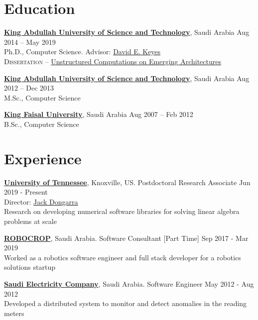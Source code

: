 \documentclass[margin]{resume2}
\begin{document}
  \begin{resume}


    \section{Education} {\bf \href{https://www.kaust.edu.sa/en}{King Abdullah University of Science and Technology}}, Saudi Arabia
                        \hfill Aug 2014 -- May 2019\\
                        Ph.D., Computer Science. {Advisor: \href{https://www.kaust.edu.sa/en/study/faculty/david-keyes}{David E. Keyes}}\\
                        \textsc{Dissertation} -- \href{https://repository.kaust.edu.sa/handle/10754/644902}
                        {Unstructured Computations on Emerging Architectures}

                        {\bf \href{https://www.kaust.edu.sa/en}{King Abdullah University of Science and Technology}}, Saudi Arabia
                        \hfill Aug 2012 -- Dec 2013\\
                        M.Sc., Computer Science

                        {\bf \href{https://www.kfu.edu.sa/sites/Home/}{King Faisal University}}, Saudi Arabia
                        \hfill Aug 2007 -- Feb 2012\\
                        B.Sc., Computer Science

    \section{Experience}{\bf \href{https://www.utk.edu/}{University of Tennessee}}, Knoxville, US. Postdoctoral Research Associate
                        \hfill Jun 2019 - Present\\
                        Director: \href{http://www.netlib.org/utk/people/JackDongarra/}{Jack Dongarra}\\
                        Research on developing numerical software libraries for solving linear algebra problems at scale

                        {\bf \href{https://innovation.kaust.edu.sa/startup-story-robocrop/}{ROBOCROP}}, Saudi Arabia. Software Consultant [Part Time]
                        \hfill Sep 2017 - Mar 2019\\
                        Worked as a robotics software engineer and full stack developer for a robotics solutions startup

                        {\bf \href{https://www.se.com.sa/en-us/Pages/home.aspx}{Saudi Electricity Company}}, Saudi Arabia. Software Engineer
                        \hfill May 2012 - Aug 2012\\
                        Developed a distributed system to monitor and detect anomalies in the reading meters


\end{resume}
\end{document}

